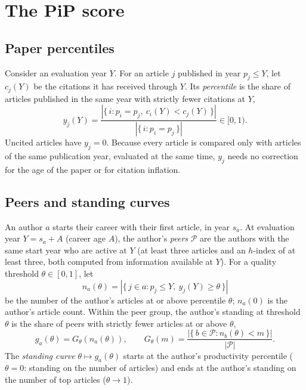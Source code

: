 \section*{The PiP score}

\subsection*{Paper percentiles}
Consider an evaluation year $Y$. For an article $j$ published in year $p_j \le Y$, let $c_j(Y)$ be the citations it has
received through $Y$. Its \emph{percentile} is the share of articles published in the same year with strictly fewer
citations at $Y$,
\begin{equation}
y_j(Y) = \frac{\left|\{\,i : p_i = p_j,\ c_i(Y) < c_j(Y)\,\}\right|}{\left|\{\,i : p_i = p_j\,\}\right|} \in [0, 1).
\end{equation}
Uncited articles have $y_j = 0$. Because every article is compared only with articles of the same publication year,
evaluated at the same time, $y_j$ needs no correction for the age of the paper or for citation inflation.

\subsection*{Peers and standing curves}
An author $a$ starts their career with their first article, in year $s_a$. At evaluation year $Y = s_a + A$ (career
age $A$), the author's \emph{peers} $\mathcal{P}$ are the authors with the same start year who are active at $Y$ (at least
three articles and an $h$-index of at least three, both computed from information available at $Y$). For a quality
threshold $\theta \in [0,1]$, let
\begin{equation}
n_a(\theta) = \left|\{\, j \in a : p_j \le Y,\ y_j(Y) \ge \theta \,\}\right|
\end{equation}
be the number of the author's articles at or above percentile $\theta$; $n_a(0)$ is the author's article count. Within
the peer group, the author's standing at threshold $\theta$ is the share of peers with strictly fewer articles at or above
$\theta$,
\begin{equation}
g_a(\theta) = G_\theta\!\left(n_a(\theta)\right), \qquad
G_\theta(m) = \frac{\left|\{\, b \in \mathcal{P} : n_b(\theta) < m \,\}\right|}{|\mathcal{P}|}.
\end{equation}
The \emph{standing curve} $\theta \mapsto g_a(\theta)$ starts at the author's productivity percentile ($\theta = 0$:
standing on the number of articles) and ends at the author's standing on the number of top articles ($\theta \to 1$).

